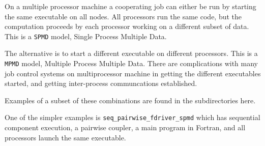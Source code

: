\begin{description}
On a multiple processor machine a cooperating job can either be run
by starting the same executable on all nodes.  All processors run the
same code, but the computation proceeds by each processor working on
a different subset of data.  This is a {\tt SPMD} model, Single Process
Multiple Data.  

The alternative is to start a different executable on different
processors.  This is a {\tt MPMD} model, Multiple Process Multiple Data.
There are complications with many job control systems on multiprocessor
machine in getting the different executables started, and getting
inter-process communcations established.

\end{description}


Examples of a subset of these combinations are found in the
subdirectories here.

One of the simpler examples is {\tt seq\_pairwise\_fdriver\_spmd} which
has sequential component execution, a pairwise coupler, a main program
in Fortran, and all processors launch the same executable.

